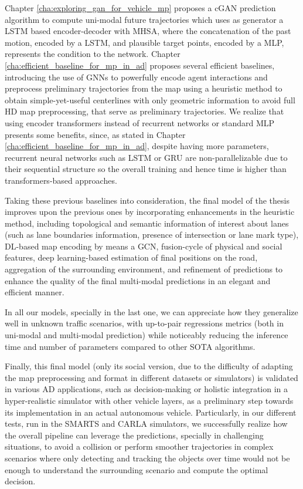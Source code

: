 Chapter \ref{cha:exploring_gan_for_vehicle_mp} proposes a \ac{cGAN} prediction algorithm to compute uni-modal future trajectories which uses as generator a \ac{LSTM} based encoder-decoder with \ac{MHSA}, where the concatenation of the past motion, encoded by a \ac{LSTM}, and plausible target points, encoded by a \ac{MLP}, represents the condition to the network. Chapter \ref{cha:efficient_baseline_for_mp_in_ad} proposes several efficient baselines, introducing the use of \acp{GNN} to powerfully encode agent interactions and preprocess preliminary trajectories from the map using a heuristic method to obtain simple-yet-useful centerlines with only geometric information to avoid full HD map preprocessing, that serve as preliminary trajectories. We realize that using encoder transformers instead of recurrent networks or standard \ac{MLP} presents some benefits, since, as stated in Chapter \ref{cha:efficient_baseline_for_mp_in_ad}, despite having more parameters, recurrent neural networks such as \ac{LSTM} or \ac{GRU} are non-parallelizable due to their sequential structure so the overall training and hence time is higher than transformers-based approaches.

Taking these previous baselines into consideration, the final model of the thesis improves upon the previous ones by incorporating enhancements in the heuristic method, including topological and semantic information of interest about lanes (such as lane boundaries information, presence of intersection or lane mark type), \ac{DL}-based map encoding by means a \ac{GCN}, fusion-cycle of physical and social features, deep learning-based estimation of final positions on the road, aggregation of the surrounding environment, and refinement of predictions to enhance the quality of the final multi-modal predictions in an elegant and efficient manner.

In all our models, specially in the last one, we can appreciate how they generalize well in unknown traffic scenarios, with up-to-pair regressions metrics (both in uni-modal and multi-modal prediction) while noticeably reducing the inference time and number of parameters compared to other \ac{SOTA} algorithms.

Finally, this final model (only its social version, due to the difficulty of adapting the map preprocessing and format in different datasets or simulators) is validated in various \ac{AD} applications, such as decision-making or holistic integration in a hyper-realistic simulator with other vehicle layers, as a preliminary step towards its implementation in an actual autonomous vehicle. Particularly, in our different tests, run in the SMARTS and CARLA simulators, we successfully realize how the overall pipeline can leverage the predictions, specially in challenging situations, to avoid a collision or perform smoother trajectories in complex scenarios where only detecting and tracking the objects over time would not be enough to understand the surrounding scenario and compute the optimal decision.

